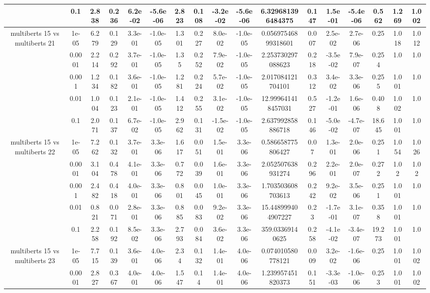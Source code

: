 \begin{tabular}{|c|c|c|c|c|c|c|c|c|c|c|c|c|c|c|c|c|}
 & 0.1 & 2.838 & 0.236 & 6.2e-02 & -5.6e-06 & 2.823 & 0.108 & -3.2e-02 & -5.6e-06 & 6.329681396484375 & 0.147 & 1.5e-01 & -5.4e-06 & 0.562 & 1.269 & 1.002 \\
\hline
\multirow{5}{*}{multiberts 15 vs multiberts 21} & 1e-05 & 6.279 & 0.129 & 3.3e-01 & -1.0e-05 & 1.301 & 0.227 & 8.0e-02 & -1.0e-05 & 0.05697546899318601 & 0.007 & 2.5e-02 & 2.7e-06 & 0.25 & 1.018 & 1.012 \\
 & 0.0001 & 2.214 & 0.292 & 3.7e-01 & -1.0e-05 & 1.35 & 0.252 & 7.9e-02 & -1.0e-05 & 2.253730297088623 & 0.218 & -3.5e-02 & 7.9e-07 & 0.254 & 1.0 & 1.0 \\
 & 0.001 & 1.234 & 0.182 & 3.6e-01 & -1.0e-05 & 1.281 & 0.224 & 5.7e-02 & -1.0e-05 & 2.017084121704101 & 0.312 & 3.4e-02 & 3.3e-06 & 0.255 & 1.001 & 1.0 \\
 & 0.01 & 1.004 & 0.123 & 2.1e-01 & -1.0e-05 & 1.412 & 0.255 & 3.1e-02 & -1.0e-05 & 12.999641418457031 & 0.527 & -1.2e-01 & 1.6e-06 & 0.408 & 1.002 & 1.0 \\
 & 0.1 & 2.071 & 0.137 & 6.7e-02 & -1.0e-05 & 2.962 & 0.131 & -1.5e-02 & -1.0e-05 & 2.637992858886718 & 0.146 & -5.0e-02 & -4.7e-07 & 18.645 & 1.001 & 1.0 \\
\hline
\multirow{5}{*}{multiberts 15 vs multiberts 22} & 1e-05 & 7.262 & 0.132 & 3.7e-01 & 3.3e-06 & 1.617 & 0.051 & 1.5e-01 & 3.3e-06 & 0.586658775806427 & 0.07 & 1.3e-01 & 2.0e-06 & 0.251 & 1.054 & 1.026 \\
 & 0.0001 & 3.104 & 0.478 & 4.1e-01 & 3.3e-06 & 0.772 & 0.039 & 1.6e-01 & 3.3e-06 & 2.052507638931274 & 0.296 & 2.2e-01 & 2.0e-07 & 0.272 & 1.02 & 1.02 \\
 & 0.001 & 2.482 & 0.418 & 4.0e-01 & 3.3e-06 & 0.801 & 0.045 & 1.0e-01 & 3.3e-06 & 1.703503608703613 & 0.242 & 9.2e-02 & 3.5e-06 & 0.251 & 1.001 & 1.0 \\
 & 0.01 & 0.821 & 0.071 & 2.8e-01 & 3.3e-06 & 0.885 & 0.083 & 9.2e-02 & 3.3e-06 & 15.448999404907227 & 0.23 & -1.7e-01 & 3.1e-07 & 0.358 & 1.001 & 1.0 \\
 & 0.1 & 2.258 & 0.192 & 8.5e-02 & 3.3e-06 & 2.793 & 0.084 & 3.6e-02 & 3.3e-06 & 359.03369140625 & 0.258 & -4.1e-02 & -3.4e-07 & 19.273 & 1.001 & 1.0 \\
\hline
\multirow{5}{*}{multiberts 15 vs multiberts 23} & 1e-05 & 7.715 & 0.139 & 3.6e-01 & 4.0e-06 & 2.34 & 0.132 & 1.4e-01 & 4.0e-06 & 0.074010580778121 & 0.009 & 3.2e-02 & -1.6e-06 & 0.25 & 1.001 & 1.002 \\
 & 0.0001 & 2.827 & 0.367 & 4.0e-01 & 4.0e-06 & 1.547 & 0.14 & 1.4e-01 & 4.0e-06 & 1.239957451820373 & 0.151 & -3.3e-03 & -1.0e-06 & 0.253 & 1.001 & 1.002 \\

\end{tabular}
